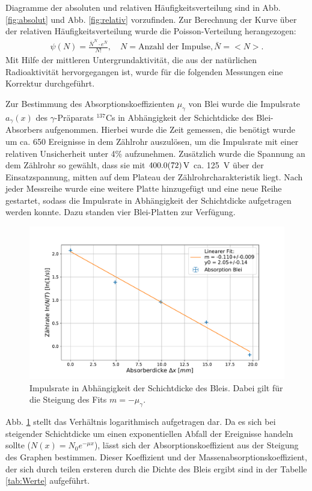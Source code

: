	Diagramme der absoluten und relativen Häufigkeitsverteilung sind in Abb. \ref{fig:absolut} und Abb. \ref{fig:relativ} vorzufinden. 
	Zur Berechnung der Kurve über der relativen Häufigkeitsverteilung wurde die Poisson-Verteilung herangezogen: 
	\begin{align}
		\psi (N) = \frac{\bar{N}^N\cdot e^{\bar{N}}}{N!}, \quad N = \text{Anzahl der Impulse}, \bar{N} = <N>.
	\end{align} 
	Mit Hilfe der mittleren Untergrundaktivität, die aus der natürlichen Radioaktivität hervorgegangen ist, wurde für die folgenden Messungen eine Korrektur durchgeführt.
	
	Zur Bestimmung des Absorptionskoeffizienten $\mu_\gamma$ von Blei wurde die Impulsrate $a_\gamma (x)$ des $\gamma$-Präparats $^{137}$Cs in Abhängigkeit der Schichtdicke des Blei-Absorbers aufgenommen.	
	Hierbei wurde die Zeit gemessen, die benötigt wurde um ca. 650 Ereignisse in dem Zählrohr auszulösen, um die Impulsrate mit einer relativen Unsicherheit unter 4\% aufzunehmen.
	Zusätzlich wurde die Spannung an dem Zählrohr so gewählt, dass sie mit $\SI{400+-7,2}{\volt}$ ca. \SI{125}{\volt} über der Einsatzspannung, mitten auf dem Plateau der Zählrohrcharakteristik liegt.
	Nach jeder Messreihe wurde eine weitere Platte hinzugefügt und eine neue Reihe gestartet, sodass die Impulsrate in Abhängigkeit der Schichtdicke aufgetragen werden konnte.
	Dazu standen vier Blei-Platten zur Verfügung.
	\begin{figure}[ht]
		\centering
		\includegraphics[width=\textwidth]{data/GammaAbsorber.pdf}
		\caption{Impulsrate in Abhängigkeit der Schichtdicke des Bleis. Dabei gilt für die Steigung des Fits $m = -\mu_\gamma$.}
		\label{fig:gamma}	
	\end{figure}
	Abb. \ref{fig:gamma} stellt das Verhältnis logarithmisch aufgetragen dar. 
	Da es sich bei steigender Schichtdicke um einen exponentiellen Abfall der Ereignisse handeln sollte ($N(x) = N_0 e^{-\mu x}$), lässt sich der Absorptionskoeffizient aus der Steigung des Graphen bestimmen.
	Dieser Koeffizient und der Massenabsorptionskoeffizient, der sich durch teilen ersteren durch die Dichte des Bleis ergibt sind in der Tabelle \ref{tab:Werte} aufgeführt.
	
